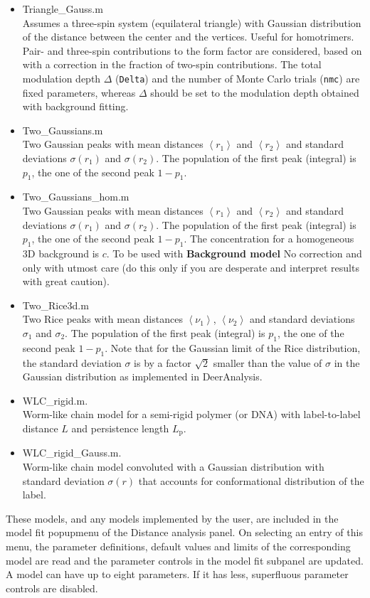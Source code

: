 \documentclass{article}
\begin{document}
\begin{itemize}
  \item {\ttfamily Triangle\_Gauss.m} \\ Assumes a three-spin system (equilateral triangle) with Gaussian distribution of the distance between the center and the vertices. Useful for homotrimers. Pair- and three-spin contributions to the form factor are considered, based on \cite{jeschke2009} with a correction in the fraction of two-spin contributions. The total modulation depth $\Delta$ (\texttt{Delta}) and the number of Monte Carlo trials (\texttt{nmc}) are fixed parameters, whereas $\Delta$  should be set to the modulation depth obtained with background fitting.
	\item {\ttfamily Two\_Gaussians.m} \\ Two Gaussian peaks with mean distances $\left\langle r_1 \right\rangle$ and $\left\langle r_2 \right\rangle$ and standard deviations $\sigma(r_1)$ and $\sigma(r_2)$. The population of the first peak (integral) is $p_1$, the one of the second peak $1-p_1$.
	\item {\ttfamily Two\_Gaussians\_hom.m} \\ Two Gaussian peaks with mean distances $\left\langle r_1 \right\rangle$ and $\left\langle r_2 \right\rangle$ and standard deviations $\sigma(r_1)$ and $\sigma(r_2)$. The population of the first peak (integral) is $p_1$, the one of the second peak $1-p_1$. The concentration for a homogeneous 3D background is $c$. To be used with {\bf Background model} {\ttfamily No correction} and only with utmost care (do this only if you are desperate and interpret results with great caution).
	\item {\ttfamily Two\_Rice3d.m} \\ Two Rice peaks \cite{koehler2011} with mean distances $\left\langle\nu_1\right\rangle$, $\left\langle\nu_2\right\rangle$ and standard deviations $\sigma_1$ and $\sigma_2$. The population of the first peak (integral) is $p_1$, the one of the second peak $1-p_1$. Note that for the Gaussian limit of the Rice distribution, the standard deviation $\sigma$ is by a factor $\sqrt{2}$ smaller than the value of $\sigma$ in the Gaussian distribution as implemented in DeerAnalysis.	
	\item {\ttfamily WLC\_rigid.m}. \\ Worm-like chain model \cite{godt2006} for a semi-rigid polymer (or DNA) with label-to-label distance $L$ and persistence length $L_\mathrm{p}$.
	\item {\ttfamily WLC\_rigid\_Gauss.m}. \\ Worm-like chain model convoluted with a Gaussian distribution with standard deviation $\sigma(r)$ that accounts for conformational distribution of the label. 
  
\end{itemize}
These models, and any models implemented by the user, are included in the {\ttfamily model fit} popupmenu of the {\ttfamily Distance analysis} panel. On selecting an entry of this menu, the parameter definitions, default values and limits of the corresponding model are read and the parameter controls in the {\ttfamily model fit} subpanel are updated. A model can have up to eight parameters. If it has less, superfluous parameter controls are disabled.
\end{document}
